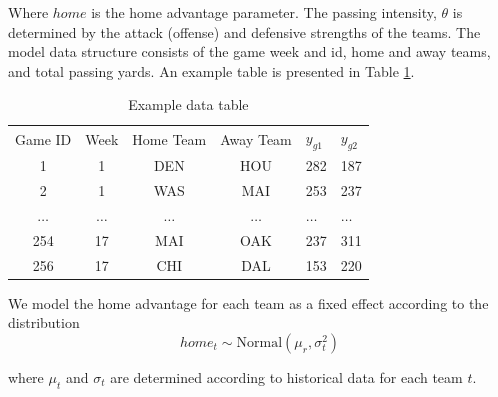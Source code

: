 \documentclass[11pt]{article}
\begin{document}
Where $home$ is the home advantage parameter. The passing intensity, $\theta$ is determined by the attack (offense) and defensive strengths of the teams. The model data structure consists of the game week and id, home and away teams, and total passing yards. An example table is presented in Table \ref{table:data-tab}.


 \begin{table}[h!]
   \centering
   \begin{tabular}{c c c c l l}
     \toprule
     Game ID & Week & Home Team & Away Team & $y_{g1}$ & $y_{g2}$  \\
     1   &  1 & DEN & HOU & 282 & 187\\
     2   &  1 & WAS & MAI & 253 & 237\\
     $\ldots$ & $\ldots$  & $\ldots$ & $\ldots$ & $\ldots$ & $\ldots$\\
     254 & 17 & MAI & OAK & 237 & 311\\
     256 & 17 & CHI & DAL & 153 & 220\\     
     \bottomrule
   \end{tabular}
   \caption{Example data table}
   \label{table:data-tab}
 \end{table}

We model the home advantage for each team as a fixed effect according to the distribution
\begin{equation}
  \label{eq:5}
  home_{t} \sim \text{Normal}(\mu_r,\sigma^2_t)
\end{equation}

where $\mu_t$ and $\sigma_t$ are determined according to historical data for each team $t$. 



{}
\end{document}
